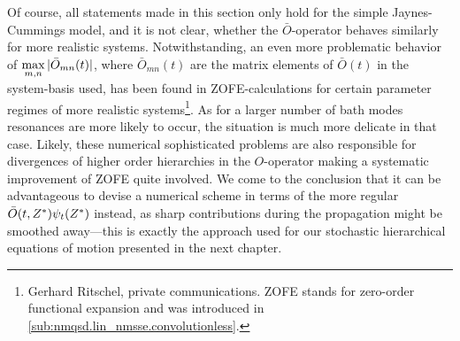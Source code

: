 Of course, all statements made in this section only hold for the simple Jaynes-Cummings model, and it is not clear, whether the $\bar O$-operator behaves similarly for more realistic systems.
Notwithstanding, an even more problematic behavior of $\max\limits_{m,n} \vert \bar O_{mn}(t) \vert$, where $\bar O_{mn}(t)$ are the matrix elements of $\bar O(t)$ in the system-basis used, has been found in \textsc{ZOFE}-calculations for certain parameter regimes of more realistic systems\footnote{%
  Gerhard Ritschel, private communications.
  \textsc{ZOFE} stands for zero-order functional expansion and was introduced in \autoref{sub:nmqsd.lin_nmsse.convolutionless}.
}.
As for a larger number of bath modes resonances are more likely to occur, the situation is much more delicate in that case.
Likely, these numerical sophisticated problems are also responsible for divergences of higher order hierarchies in the $O$-operator making a systematic improvement of \textsc{ZOFE} quite involved.
We come to the conclusion that it can be advantageous to devise a numerical scheme in terms of the more regular $\bar O(t, \ZZ) \psitZ$ instead, as sharp contributions during the propagation might be smoothed away---this is exactly the approach used for our stochastic hierarchical equations of motion presented in the next chapter.
